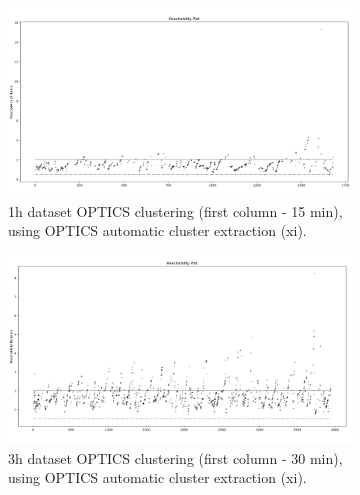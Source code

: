   \begin{figure}[H]
    \centering
    \begin{subfigure}{.5\textwidth}\captionsetup{width=.8\linewidth}
      \centering
      \includegraphics[width=1\textwidth]{./images/clusteringResults/1h-1-reachabilityPlot-xi.png}
    \caption{1h dataset OPTICS clustering (first column - 15 min), using OPTICS automatic cluster extraction (xi).}
    \end{subfigure}%
    \begin{subfigure}{.5\textwidth}\captionsetup{width=.8\linewidth}
      \centering
      \includegraphics[width=1\textwidth]{./images/clusteringResults/3h-1-reachabilityPlot-xi.png}
      \caption{3h dataset OPTICS clustering (first column - 30 min), using OPTICS automatic cluster extraction (xi).}
    \end{subfigure}
    \caption{}
    \label{figure:OPTICSResultsReachabilityPlot}
    \end{figure}

